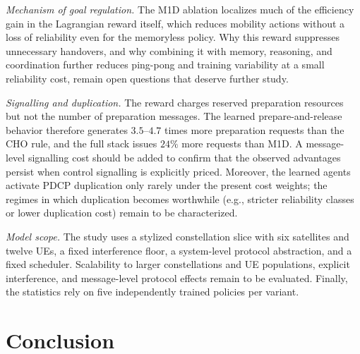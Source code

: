 \documentclass[journal]{IEEEtran}
\begin{document}
\emph{Mechanism of goal regulation.} The M1D ablation localizes much of the
efficiency gain in the Lagrangian reward itself, which reduces mobility actions
without a loss of reliability even for the memoryless policy. Why this reward
suppresses unnecessary handovers, and why combining it with memory, reasoning,
and coordination further reduces ping-pong and training variability at a small
reliability cost, remain open questions that deserve further study.

\emph{Signalling and duplication.} The reward charges reserved preparation
resources but not the number of preparation messages. The learned
prepare-and-release behavior therefore generates $3.5$--$4.7$ times more
preparation requests than the CHO rule, and the full stack issues $24\%$
more requests than M1D. A message-level signalling cost should be added to
confirm that the observed advantages persist when control
signalling is explicitly priced. Moreover, the learned agents activate PDCP
duplication only rarely under the present cost weights; the regimes in which
duplication becomes worthwhile (e.g., stricter reliability classes or lower
duplication cost) remain to be characterized.

\emph{Model scope.} The study uses a stylized constellation slice with six
satellites and twelve UEs, a fixed interference floor, a system-level
protocol abstraction, and a fixed scheduler. Scalability to larger
constellations and UE populations, explicit interference, and message-level
protocol effects remain to be evaluated. Finally, the statistics rely on five
independently trained policies per variant.

\section{Conclusion}
\label{sec:conclusion}
\end{document}
